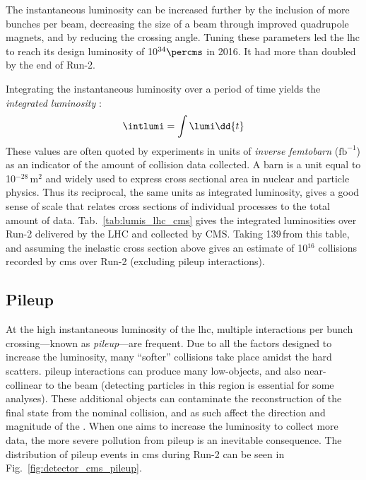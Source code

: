 
The instantaneous luminosity can be increased further by the inclusion of more bunches per beam, decreasing the size of a beam through improved quadrupole magnets, and by reducing the crossing angle. Tuning these parameters led the \acrshort{lhc} to reach its design luminosity of 10$^{34}\percms$ in 2016. It had more than doubled by the end of Run-2.

Integrating the instantaneous luminosity over a period of time yields the \emph{integrated luminosity} \intlumi:
\begin{equation}
    \intlumi = \int \lumi \dd{t}
    \label{eq:lumi_integrated}
\end{equation}
These values are often quoted by experiments in units of \emph{inverse femtobarn} ($\text{fb}^{-1}$) as an indicator of the amount of collision data collected. A barn is a unit equal to 10$^{-28}$\,m$^2$ and widely used to express cross sectional area in nuclear and particle physics. Thus its reciprocal, the same units as integrated luminosity, gives a good sense of scale that relates cross sections of individual processes to the total amount of data. Tab.~\ref{tab:lumis_lhc_cms} gives the integrated luminosities over Run-2 delivered by the LHC and collected by CMS. Taking 139\,\fbinv from this table, and assuming the inelastic \pp cross section above gives an estimate of 10$^{16}$ collisions recorded by \acrshort{cms} over Run-2 (excluding \gls{pileup} interactions).




\subsection{Pileup}
\label{subsec:pileup}

At the high instantaneous luminosity of the \acrshort{lhc}, multiple interactions per bunch crossing---known as \emph{\gls{pileup}}---are frequent. Due to all the factors designed to increase the luminosity, many ``softer'' collisions take place amidst the hard scatters. \Gls{pileup} interactions can produce many low-\pt objects, and also near-collinear to the beam (detecting particles in this region is essential for some analyses). These additional objects can contaminate the reconstruction of the final state from the nominal collision, and as such affect the direction and magnitude of the \ptvecmiss. When one aims to increase the luminosity to collect more data, the more severe pollution from \gls{pileup} is an inevitable consequence. The distribution of \gls{pileup} events in \acrshort{cms} during Run-2 can be seen in Fig.~\ref{fig:detector_cms_pileup}.

